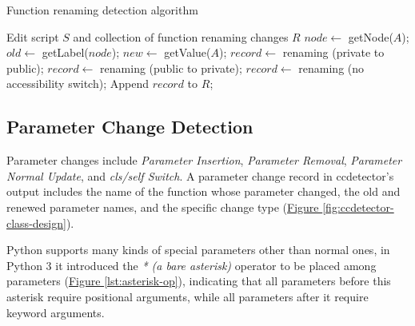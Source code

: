 \begin{algorithm}
	\label{algo:function-renaming-detection}
	\caption{Function renaming detection algorithm}
	\SetAlgoLined
	\begin{algorithmic}[1]
		\REQUIRE Edit script $S$ and collection of function renaming changes $R$
			\STATE $node \gets$ getNode($A$);
				\STATE $old \gets$ getLabel($node$);
				\STATE $new \gets$ getValue($A$);
					\STATE $record \gets$ renaming (private to public);
					\STATE $record \gets$ renaming (public to private);
				\ELSE
					\STATE $record \gets$ renaming (no accessibility switch);
				\ENDIF
				\STATE Append $record$ to $R$;
			\ENDIF
		\ENDFOR
	\end{algorithmic}
\end{algorithm}

\subsection{Parameter Change Detection}
\label{subsec:param-change-detect}

Parameter changes include \textit{Parameter Insertion}, \textit{Parameter Removal}, \textit{Parameter Normal Update}, and \textit{cls/self Switch}. A parameter change record in ccdetector's output includes the name of the function whose parameter changed, the old and renewed parameter names, and the specific change type (\hyperref[fig:ccdetector-class-design]{Figure \ref*{fig:ccdetector-class-design}}).

Python supports many kinds of special parameters other than normal ones, in Python 3 it introduced the \textit{* (a bare asterisk)} operator to be placed among parameters (\hyperref[lst:asterisk-op]{Figure \ref*{lst:asterisk-op}}), indicating that all parameters before this asterisk require positional arguments, while all parameters after it require keyword arguments.

\begin{figure}[!t]
	
	\vspace{-5mm}
\end{figure}

